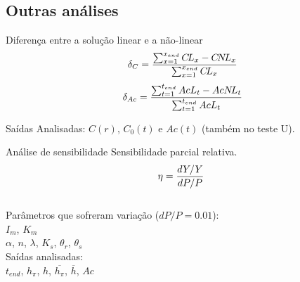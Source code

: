 \subsection{Outras análises}
\begin{frame}
  \begin{block}{Diferença entre a solução linear e a não-linear}
    $$
    \delta_C  = {\sum_{x=1}^{x_{end}} C\!L_x - C\!N\!L_x \over \sum_{x=1}^{x_{end}} C\!L_x}
    $$
    $$
    \delta_{Ac} = {\sum_{t=1}^{t_{end}} AcL_t - AcN\!L_t \over \sum_{t=1}^{t_{end}} AcL_t}
    $$

    Saídas Analisadas: $C(r)$, $C_0(t)$ e $Ac(t)$ (também no teste U).
  \end{block}

  \pause
  \begin{block}{Análise de sensibilidade}
    Sensibilidade parcial relativa.
    $$
    \eta = {dY/Y \over dP/P}\
    $$
    \\[.2cm]
    Parâmetros que sofreram variação ($dP/P = 0.01$):\\
    $I_m$, $K_m$\\
    $\alpha$, $n$, $\lambda$, $K_s$, $\theta_r$, $\theta_s$\\[.2cm]

    Saídas analisadas:\\
    $t_{end}$, $h_\pi$, $h$, $\overline{h_\pi}$, $\overline{h}$, $Ac$ 

  \end{block}
\end{frame}

